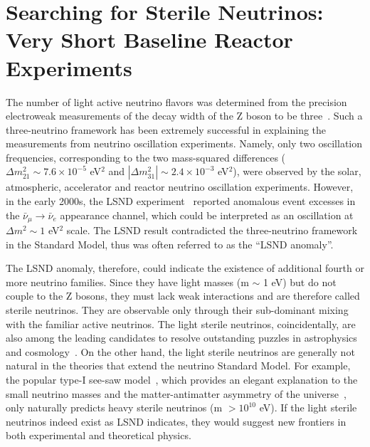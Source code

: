 \section{Searching for Sterile Neutrinos: Very Short Baseline Reactor Experiments}

The number of light active neutrino flavors was determined from the precision electroweak measurements of the decay width of the Z boson to be three~\cite{EW-2005}. 
Such a three-neutrino framework has been extremely successful in explaining the measurements from neutrino oscillation experiments. 
Namely, only two oscillation frequencies, corresponding to the two mass-squared differences ($\Delta m_{21}^2\sim7.6\times10^{-5}$ eV$^2$ and $|\Delta m_{31}^2|\sim2.4\times10^{-3}$ eV$^2$), were observed by the solar, atmospheric, accelerator and reactor neutrino oscillation experiments. 
However, in the early 2000s, the LSND experiment~\cite{LSND2001} reported anomalous event excesses in the $\bar\nu_\mu\rightarrow\bar\nu_e$ appearance channel, which could be interpreted as an oscillation at $\Delta m^2\sim1$ eV$^2$ scale. 
The LSND result contradicted the three-neutrino framework in the Standard Model, thus was often referred to as the ``LSND anomaly''.

The LSND anomaly, therefore, could indicate the existence of additional
fourth or more neutrino families. 
Since they have light masses (m $\sim$ 1 eV) but do not couple to the Z bosons, they must lack weak interactions and are therefore called sterile neutrinos. 
They are observable only through their sub-dominant mixing with the familiar active neutrinos. 
The light sterile neutrinos, coincidentally, are also among the leading candidates to resolve outstanding puzzles in astrophysics and cosmology~\cite{Dodelson,Kusenko,Wyman,Battye}.
On the other hand, the light sterile neutrinos are generally not natural in the theories that extend the neutrino Standard Model. 
For example, the popular type-I see-saw model~\cite{Minkowski,Yanagida,GellMann,Mohapatra}, which provides an elegant explanation to the small neutrino masses and the matter-antimatter asymmetry of the universe~\cite{Fukugita}, only naturally predicts heavy sterile neutrinos (m $>10^{10}$ eV).
If the light sterile neutrinos indeed exist as LSND indicates, they would suggest new frontiers in both experimental and theoretical physics.

